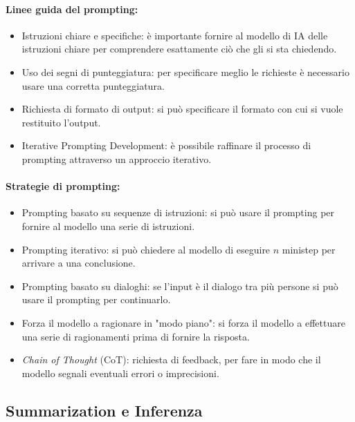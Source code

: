 
\paragraph{Linee guida del prompting:}

\begin{itemize}
  \item Istruzioni chiare e specifiche: è importante fornire al modello di IA delle istruzioni chiare per comprendere esattamente ciò che gli si sta chiedendo. 
  \item Uso dei segni di punteggiatura: per specificare meglio le richieste è necessario usare una corretta punteggiatura. 
  \item Richiesta di formato di output: si può specificare il formato con cui si vuole restituito l'output.
  \item Iterative Prompting Development: è possibile raffinare il processo di prompting attraverso un approccio iterativo.
\end{itemize}

\paragraph{Strategie di prompting:}

\begin{itemize}
  \item Prompting basato su sequenze di istruzioni: si può usare il prompting per fornire al modello una serie di istruzioni.
  \item Prompting iterativo: si può chiedere al modello di eseguire $n$ ministep per arrivare a una conclusione.
  \item Prompting basato su dialoghi: se l'input è il dialogo tra più persone si può usare il prompting per continuarlo.
  \item Forza il modello a ragionare in "modo piano": si forza il modello a effettuare una serie di ragionamenti prima di fornire la risposta.
  \item \textit{Chain of Thought} (CoT): richiesta di feedback, per fare in modo che il modello segnali eventuali errori o imprecisioni.
\end{itemize}

\subsection{Summarization e Inferenza}

